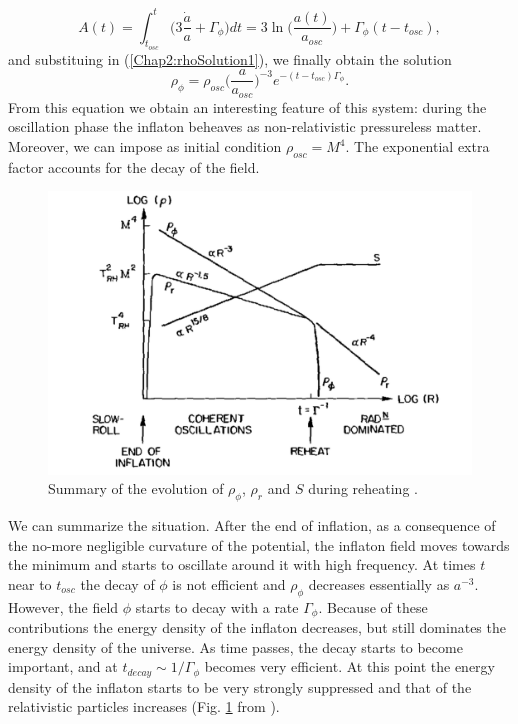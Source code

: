 \documentclass[11pt,a4paper,twoside]{book}
\begin{document}
\begin{equation}
	\label{Chap2:solutionAt)}
	A(t)= \int_{t_{osc}}^{t}\Big (3 \frac{\dot{a}}{a} + \Gamma_{\phi}\Big) dt = 3 \ln \Big(\frac{a(t)}{a_{osc}}\Big) + \Gamma_{\phi}(t-t_{osc}),
\end{equation}
and substituing in (\ref{Chap2:rhoSolution1}), we finally obtain the solution
\begin{equation}
\label{Chap2:rhoSolution}
\rho_{\phi} = \rho_{osc} \Big (\frac{a}{a_{osc}}\Big)^{-3}e^{-(t-t_{osc})\Gamma_{\phi}}.	
\end{equation}
From this equation we obtain an interesting feature of this system: during the oscillation phase the inflaton beheaves as non-relativistic pressureless matter. Moreover, we can impose as initial condition $ \rho_{osc}=M^{4} $.
The exponential extra factor accounts for the decay of the field.
\begin{figure}
	\centering
	\includegraphics[width=0.8\linewidth, height=0.3\textheight]{Images/Chap2/EvolutionEnergyDensity}
	\caption{Summary of the evolution of $\rho_{\phi}$, $ \rho_{r} $ and $ S $ during reheating \cite{Chap2:Kolb_Turner}.}
	\label{fig:evolutionenergydensity}
\end{figure}

We can summarize the situation. After the end of inflation, as a consequence of the no-more negligible curvature of the potential, the inflaton field moves towards the minimum and starts to oscillate around it with  high frequency. At times $ t $ near to $ t_{osc} $ the decay of $\phi$ is not efficient and $\rho_{\phi}$ decreases essentially as $ a^{-3} $. However, the field $\phi$ starts to decay with a rate $\Gamma_{\phi}$. Because of these contributions the energy density of the inflaton decreases, but still dominates the energy density of the universe. As time passes, the decay starts to become important, and  at $ t_{decay} \sim 1/\Gamma_{\phi} $ becomes very efficient.
At this point the energy density of the inflaton starts to be very strongly suppressed and that of the relativistic particles increases (Fig. \ref{fig:evolutionenergydensity} from \cite{Chap2:Kolb_Turner}).
\end{document}
